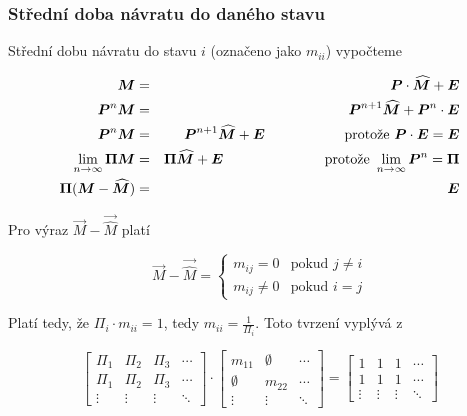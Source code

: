 \subsubsection{Střední doba návratu do daného stavu}
Střední dobu návratu do stavu $i$ (označeno jako $m_{ii}$) vypočteme

\begin{eqnarray*}
\vec{M} & = & \vec{P}\cdot\vec{\widehat{M}}+\vec{E}\\
\vec{P}^n\vec{M} &=& \vec{P}^{n+1}\vec{\widehat{M}}+\vec{P}^n\cdot\vec{E}\\
\vec{P}^n\vec{M} &=& \vec{P}^{n+1}\vec{\widehat{M}}+\vec{E}\hspace*{2cm} \text{protože }\vec{P}\cdot\vec{E}=\vec{E}\\
\lim_{n\to\infty}\vec{\Pi}\vec{M} &=& \vec{\Pi}\vec{\widehat{M}}+\vec{E}\hspace*{2.55cm} \text{protože } \lim_{n\to\infty}\vec{P}^n=\vec{\Pi}\\
\vec{\Pi}(\vec{M}-\vec{\widehat{M}}) & = & \vec{E}
\end{eqnarray*}

Pro výraz $\vec{M}-\vec{\widehat{M}}$ platí

\[ \vec{M}-\vec{\widehat{M}} = 
\begin{cases}
m_{ij}=0 & \text{pokud } j\neq i\\
m_{ij}\neq 0 & \text{pokud } i = j
\end{cases}
 \]
 
Platí tedy, že $\Pi_i\cdot m_{ii}=1$, tedy $m_{ii}=\frac{1}{\Pi_i}$. Toto tvrzení vyplývá z

\[
\begin{bmatrix}
\Pi_1 & \Pi_2 & \Pi_3 & \cdots \\
\Pi_1 & \Pi_2 & \Pi_3 & \cdots \\
\vdots & \vdots & \vdots & \ddots
\end{bmatrix} \cdot
\begin{bmatrix}
m_{11} & \emptyset & \cdots \\
\emptyset & m_{22} & \cdots \\
\vdots & \vdots & \ddots
\end{bmatrix} = 
\begin{bmatrix}
1 & 1 & 1 & \cdots \\
1 & 1 & 1 & \cdots \\
\vdots & \vdots & \vdots & \ddots
\end{bmatrix}
\]